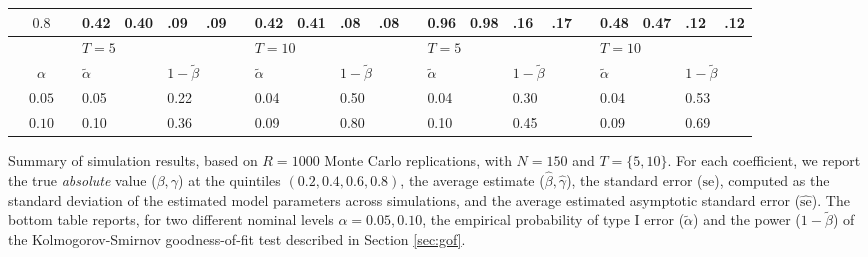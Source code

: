 \documentclass[12pt]{article}
\begin{document}
\begin{sidewaystable}
\begin{tabular}{cc
m{0.01cm}m{0.45cm}m{0.45cm}m{0.2cm}m{0.2cm}
m{0.01cm}m{0.45cm}m{0.45cm}m{0.2cm}m{0.2cm}
m{0.01cm}m{0.45cm}m{0.45cm}m{0.2cm}m{0.2cm}
m{0.01cm}m{0.45cm}m{0.45cm}m{0.2cm}m{0.2cm}
}
& $0.8$ && 0.42 & 0.40 & .09 & .09	&& 0.42 & 0.41 & .08 & .08	&& 0.96 & 0.98 & .16 & .17	&& 0.48 & 0.47 & .12 & .12\\
\hline
\hline
\cline{4-12}\cline{14-22}
&&& \multicolumn{4}{l}{$T = 5$} && \multicolumn{4}{l}{$T = 10$} && \multicolumn{4}{l}{$T = 5$} && \multicolumn{4}{l}{$T = 10$}\\
\cline{4-7}\cline{9-12}\cline{14-17}\cline{19-22}
& $\alpha$ &&  
	$\tilde{\alpha}$& &   \multicolumn{2}{l}{$1 - \tilde{\beta}$} &&
	$\tilde{\alpha}$& &   \multicolumn{2}{l}{$1 - \tilde{\beta}$} &&
	$\tilde{\alpha}$& &   \multicolumn{2}{l}{$1 - \tilde{\beta}$} &&
	$\tilde{\alpha}$& &   \multicolumn{2}{l}{$1 - \tilde{\beta}$}\\
& $0.05$ && 0.05 && 0.22 &&& 0.04 && 0.50 &&& 0.04 && 0.30 &&& 0.04 && 0.53\\
& $0.10$ && 0.10 && 0.36 &&& 0.09 && 0.80 &&& 0.10 && 0.45 &&& 0.09 && 0.69\\
\hline
\hline
\end{tabular}
\footnotesize\center
Summary of simulation results, based on $R = 1000$ Monte Carlo replications, with $N = 150$ and $T = \{5, 10\}$. 
For each coefficient, we report the true \textit{absolute} value ($\beta, \gamma$) at the quintiles $(0.2, 0.4, 0.6, 0.8)$,
the average estimate ($\hat\beta, \hat\gamma$), the standard error ($\text{se}$), computed as the standard deviation
of the estimated model parameters across simulations, and the average estimated asymptotic standard error ($\hat{\text{se}}$). 
The bottom table reports, for two different nominal levels $\alpha = 0.05, 0.10$, the empirical probability
of type I error ($\tilde{\alpha}$) and the power ($1 - \tilde{\beta}$) of the Kolmogorov-Smirnov goodness-of-fit test described in Section \ref{sec:gof}.
\end{sidewaystable}
\end{document}
